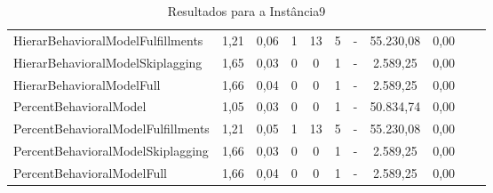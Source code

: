 \begin{table}[h!]
{\begin{tabular}{lcccccccccc}
			HierarBehavioralModelFulfillments  & 1,21   & 0,06 & 1 & 13  & 5 & -          & 55.230,08 & 0,00 \\ 
			HierarBehavioralModelSkiplagging   & 1,65   & 0,03 & 0 & 0   & 1 & -          & 2.589,25  & 0,00 \\ 
			HierarBehavioralModelFull          & 1,66   & 0,04 & 0 & 0   & 1 & -          & 2.589,25  & 0,00 \\ \hline
			PercentBehavioralModel             & 1,05   & 0,03 & 0 & 0   & 1 & -          & 50.834,74 & 0,00 \\ 
			PercentBehavioralModelFulfillments & 1,21   & 0,05 & 1 & 13  & 5 & -          & 55.230,08 & 0,00 \\ 
			PercentBehavioralModelSkiplagging  & 1,66   & 0,03 & 0 & 0   & 1 & -          & 2.589,25  & 0,00 \\ 
			PercentBehavioralModelFull         & 1,66   & 0,04 & 0 & 0   & 1 & -          & 2.589,25  & 0,00 \\ \hline
		\end{tabular}%
	}
	\caption{Resultados para a Instância9}
	\label{tab:resul_instan9}
\end{table}


